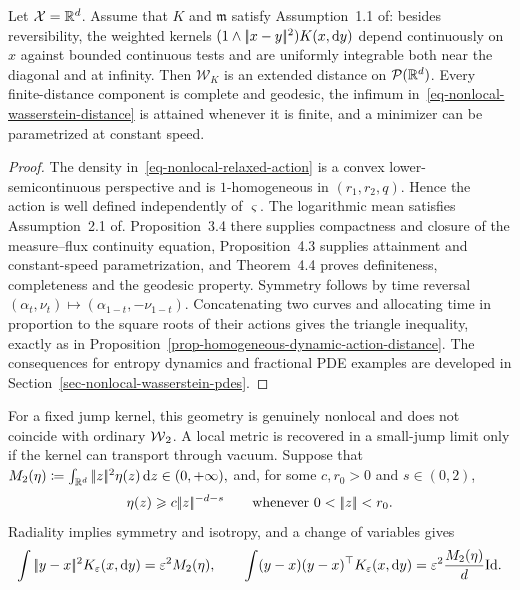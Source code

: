 \begin{prop}\label{prop-nonlocal-distance-properties}
Let $\mathcal X=\mathbb{R}^d$. Assume that $K$ and $\mathfrak m$ satisfy Assumption~1.1 of: besides reversibility, the weighted kernels $(1\wedge|\!| x-y |\!|^2)K(x,\mathrm{d} y)$ depend continuously on $x$ against bounded continuous tests and are uniformly integrable both near the diagonal and at infinity. Then $\mathcal W_K$ is an extended distance on $\mathcal{P}(\mathbb{R}^d)$. Every finite-distance component is complete and geodesic, the infimum in~\eqref{eq-nonlocal-wasserstein-distance} is attained whenever it is finite, and a minimizer can be parametrized at constant speed.
\end{prop}
\begin{proof}
The density in~\eqref{eq-nonlocal-relaxed-action} is a convex lower-semicontinuous perspective and is $1$-homogeneous in $(r_1,r_2,q)$. Hence the action is well defined independently of $\varsigma$. The logarithmic mean satisfies Assumption~2.1 of. Proposition~3.4 there supplies compactness and closure of the measure--flux continuity equation, Proposition~4.3 supplies attainment and constant-speed parametrization, and Theorem~4.4 proves definiteness, completeness and the geodesic property. Symmetry follows by time reversal $(\alpha_t,\nu_t)\mapsto(\alpha_{1-t},-\nu_{1-t})$. Concatenating two curves and allocating time in proportion to the square roots of their actions gives the triangle inequality, exactly as in Proposition~\ref{prop-homogeneous-dynamic-action-distance}. The consequences for entropy dynamics and fractional PDE examples are developed in Section~\ref{sec-nonlocal-wasserstein-pdes}.
\end{proof}
For a fixed jump kernel, this geometry is genuinely nonlocal and does not coincide with ordinary $\operatorname{\mathcal{W}}_2$. A local metric is recovered in a small-jump limit only if the kernel can transport through vacuum. Suppose that
\(M_2(\eta)\coloneqq\int_{\mathbb{R}^d}|\!| z |\!|^2\eta(z)\,\mathrm{d} z\in(0,+\infty),\)
and, for some $c,r_0>0$ and $s\in(0,2)$,
\begin{equation}\label{eq-small-jump-singular-lower-bound}
\eta(z)\geq c\norm{z}^{-d-s}
\qquad\text{whenever }0<\norm{z}<r_0.
\end{equation}
Radiality implies symmetry and isotropy, and a change of variables gives
\begin{equation}\label{eq-small-jump-kernel-moments}
\int|\!| y-x |\!|^2K_\varepsilon(x,\mathrm{d} y)
=
\varepsilon^2M_2(\eta),
\qquad
\int (y-x)(y-x)^\top K_\varepsilon(x,\mathrm{d} y)
=
\varepsilon^2\frac{M_2(\eta)}{d}\mathrm{Id}.
\end{equation}
